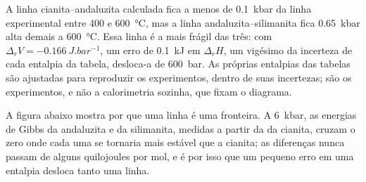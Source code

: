A linha cianita--andaluzita calculada fica a menos de \qty{0.1}{kbar} da linha experimental
entre 400 e \qty{600}{\celsius}, mas a linha andaluzita--silimanita fica
\qty{0.65}{kbar} alta demais a \qty{600}{\celsius}. Essa linha é a mais frágil das
três: com $\Delta_r V = \qty{-0.166}{J.bar^{-1}}$, um erro de \qty{0.1}{kJ} em
$\Delta_r H$, um vigésimo da incerteza de cada entalpia da tabela, desloca-a de
\qty{600}{bar}. As próprias entalpias das tabelas são ajustadas para reproduzir os
experimentos, dentro de suas incertezas; são os experimentos, e não a calorimetria sozinha, que fixam o
diagrama.

A figura abaixo mostra por que uma linha é uma fronteira. A \qty{6}{kbar}, as energias de Gibbs da
andaluzita e da silimanita, medidas a partir da da cianita, cruzam o zero onde cada uma se
tornaria mais estável que a cianita; as diferenças nunca passam de alguns quilojoules por mol,
e é por isso que um pequeno erro em uma entalpia desloca tanto uma linha.

\begin{omfigure}
\centering
{}
\par{}
\end{omfigure}

